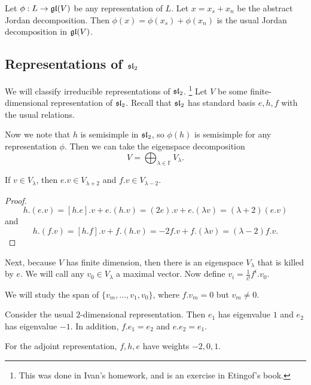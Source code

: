 \documentclass[twoside, 10pt]{article}
\newcommand{\F}{\mathbb{F}}
\begin{document}
    \begin{cor}
        Let $\phi:L \to \mathfrak{gl}(V)$ be any representation of $L$. Let $x = x_s + x_n$ be the abstract Jordan decomposition. Then $\phi(x) = \phi(x_s) + \phi(x_n)$ is the usual Jordan decomposition in $\mathfrak{gl}(V)$.
    \end{cor}

    \subsection{Representations of $\mathfrak{sl}_2$}%
    \label{sub:representations_of_al_2_}
    
    We will classify irreducible representations of $\mathfrak{sl}_2$. \footnote{This was done in Ivan's homework, and is an exercise in Etingof's book.} Let $V$ be some finite-dimensional representation of $\mathfrak{sl}_2$. Recall that $\mathfrak{sl}_2$ has standard basis $e,h,f$ with the usual relations.

    Now we note that $h$ is semisimple in $\mathfrak{sl}_2$, so $\phi(h)$ is semisimple for any representation $\phi$. Then we can take the eigenspace decomposition
    \[ V = \bigoplus_{\lambda \in \F} V_{\lambda}.\]

    \begin{lem}
        If $v \in V_{\lambda}$, then $e.v \in V_{\lambda + 2}$ and $f.v \in V_{\lambda - 2}$.
    \end{lem}

    \begin{proof}
        \[ h.(e.v) = [h.e].v + e.(h.v) = (2e).v + e.(\lambda v) = (\lambda + 2)(e.v)\]
        and 
        \[ h.(f.v) = [h.f].v + f.(h.v) = -2f.v + f.(\lambda v) = (\lambda -2) f.v.\]
    \end{proof}

    Next, because $V$ has finite dimension, then there is an eigenspace $V_{\lambda}$ that is killed by $e$. We will call any $v_0 \in V_{\lambda}$ a maximal vector. Now define $v_i = \frac{1}{i!}f^i.v_0$.

    We will study the span of $\{v_m, \ldots, v_1, v_0\}$, where $f.v_m = 0$ but $v_m \neq 0$.

    \begin{exm}
        Consider the usual $2$-dimensional representation. Then $e_1$ has eigenvalue $1$ and $e_2$ has eigenvalue $-1$. In addition, $f.e_1 = e_2$ and $e.e_2 = e_1$.

        For the adjoint representation, $f,h,e$ have weights $-2,0,1$.
    \end{exm}
\end{document}
